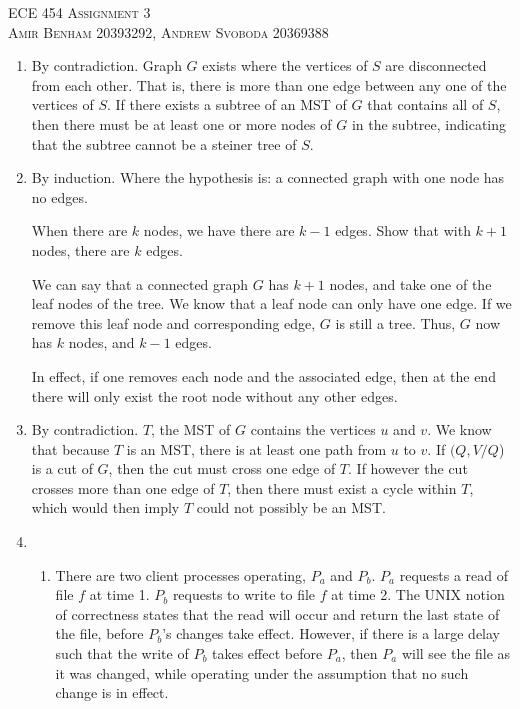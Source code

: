 \documentclass{article}
\begin{document}
\begin{center}
\textsc{\Large ECE 454 Assignment 3}\\[0.5cm]
\textsc{Amir Benham 20393292, Andrew Svoboda 20369388}\\[0.5cm]
\end{center}

\begin{enumerate}

	\item  

By contradiction. Graph \(G\) exists where the vertices of \(S\) are disconnected from each other. That is, there is more than one edge between any one of the vertices of \(S\). If there exists a subtree of an MST of \(G\) that contains all of \(S\), then there must be at least one or more nodes of \(G\) in the subtree, indicating that the subtree cannot be a steiner tree of \(S\).

	\item 
	By induction. Where the hypothesis is: a connected graph with one node has no edges.
	
	When there are \(k\) nodes, we have there are \(k-1\) edges. Show that with \(k+1\) nodes, there are \(k\) edges. 

	We can say that a connected graph \(G\) has \(k+1\) nodes, and take one of the leaf nodes of the tree. We know that a leaf node can only have one edge. If we remove this leaf node and corresponding edge, \(G\) is still a tree. Thus, \(G\) now has \(k\) nodes, and \(k - 1\) edges.

	In effect, if one removes each node and the associated edge, then at the end there will only exist the root node without any other edges. 

	\item 

		By contradiction. \(T\), the MST of \(G\) contains the vertices \(u\) and \(v\). We know that because \(T\) is an MST, there is at least one path from \(u\) to \(v\). If \((Q, V / Q\)) is a cut of \(G\), then the cut must cross one edge of \(T\). If however the cut crosses more than one edge of \(T\), then there must exist a cycle within \(T\), which would then imply \(T\) could not possibly be an MST.


	\item 

	\begin{enumerate}
		\item There are two client processes operating, \(P_a\) and \(P_b\). \(P_a\) requests a read of file \(f\) at time 1.  \(P_b\) requests to write to file \(f\) at time 2. The UNIX notion of correctness states that the read will occur and return the last state of the file, before \(P_b\)'s changes take effect. However, if there is a large delay such that the write of \(P_b\) takes effect before \(P_a\), then \(P_a\) will see the file as it was changed, while operating under the assumption that no such change is in effect.


\end{enumerate}
\end{enumerate}
\end{document}
